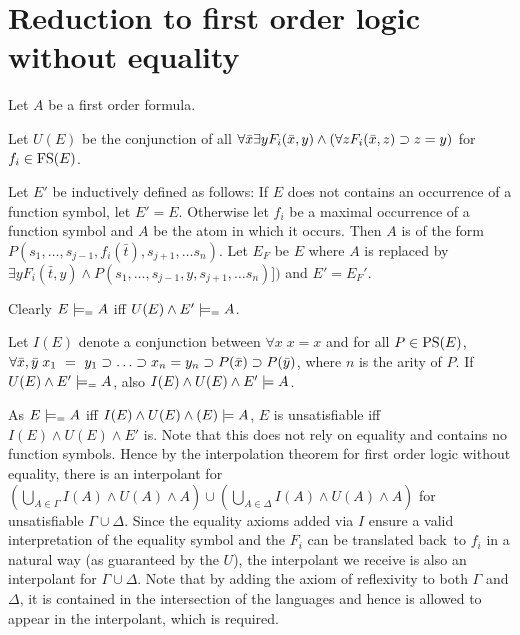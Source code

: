 
\section{Reduction to first order logic without equality}


Let $A$ be a first order formula.

Let $U(E)$ be the conjunction of all $\forall \bar x \exists y F_i(\bar x, y) \land (\forall z F_i(\bar x, z) \supset z = y)$ for $f_i \in \mathrm{FS}(E)$.

Let $E'$ be inductively defined as follows: If $E$ does not contains an occurrence of a function symbol, let $E' = E$.
Otherwise let $f_i$ be a maximal occurrence of a function symbol and $A$ be the atom in which it occurs. Then $A$ is of the form $P(s_1, \ldots, s_{j-1}, f_i(\bar t), s_{j+1}, \ldots s_n)$.
Let $E_F$ be $E$ where $A$ is replaced by $\exists y F_i(\bar t, y) \land P(s_1, \ldots, s_{j-1}, y, s_{j+1}, \ldots s_n)])$ and $E' = E_F'$.

Clearly $E \models_= A$ iff $U(E) \land  E' \models_= A$.

Let $I(E)$ denote a conjunction between $\forall x \; x=x$ and for all $P \in\mathrm{PS}(E)$, $\forall \bar x, \bar y\; x_1~=~y_1 \supset \ldots \supset x_n = y_n \supset P(\bar x) \supset P(\bar y)$, where $n$ is the arity of $P$.
If $U(E) \land E' \models_= A$,
also $I(E) \land U(E) \land E' \models A$. 


As $E \models_= A$ iff $I(E) \land U(E) \land (E) \models A$, $E$ is unsatisfiable iff $I(E) \land U(E) \land E'$ is.
Note that this does not rely on equality and contains no function symbols. Hence by the interpolation theorem for first order logic without equality, there is an interpolant for $\left(\bigcup_{A\in \Gamma} I(A) \land U(A) \land A\right) \cup \left(\bigcup_{A\in \Delta} I(A) \land U(A) \land A\right) $ for unsatisfiable $\Gamma \cup \Delta$.
Since the equality axioms added via $I$ ensure a valid interpretation of the equality symbol and the $F_i$ can be translated back\ to $f_i$ in a natural way (as guaranteed by the $U$), the interpolant we receive is also an interpolant for $\Gamma \cup \Delta$.
Note that by adding the axiom of reflexivity to both $\Gamma$ and $\Delta$, it is contained in the intersection of the languages and hence is allowed to appear in the interpolant, which is required. 


